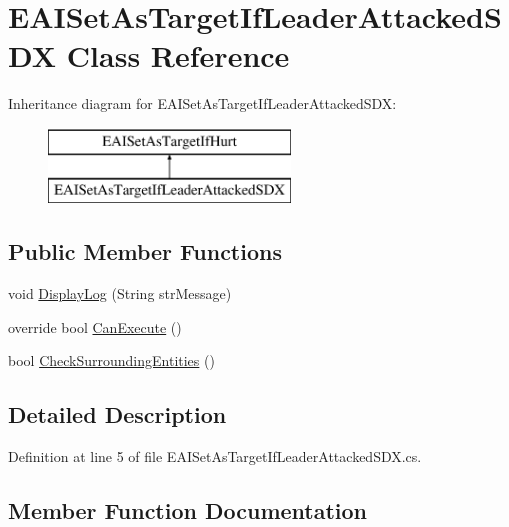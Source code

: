 \hypertarget{class_e_a_i_set_as_target_if_leader_attacked_s_d_x}{}\section{E\+A\+I\+Set\+As\+Target\+If\+Leader\+Attacked\+S\+DX Class Reference}
\label{class_e_a_i_set_as_target_if_leader_attacked_s_d_x}
Inheritance diagram for E\+A\+I\+Set\+As\+Target\+If\+Leader\+Attacked\+S\+DX\+:\begin{figure}[H]
\begin{center}
\leavevmode
\includegraphics[height=2.000000cm]{class_e_a_i_set_as_target_if_leader_attacked_s_d_x}
\end{center}
\end{figure}
\subsection*{Public Member Functions}
\begin{DoxyCompactItemize}
\item 
void \mbox{\hyperlink{class_e_a_i_set_as_target_if_leader_attacked_s_d_x_ac6971e678bcccd43ead16491145e3c4b}{Display\+Log}} (String str\+Message)
\item 
override bool \mbox{\hyperlink{class_e_a_i_set_as_target_if_leader_attacked_s_d_x_a41a5de3f7eaca129bbfadb0e84375494}{Can\+Execute}} ()
\item 
bool \mbox{\hyperlink{class_e_a_i_set_as_target_if_leader_attacked_s_d_x_a69887bc9691491549b640e9aa4bb00bd}{Check\+Surrounding\+Entities}} ()
\end{DoxyCompactItemize}


\subsection{Detailed Description}


Definition at line 5 of file E\+A\+I\+Set\+As\+Target\+If\+Leader\+Attacked\+S\+D\+X.\+cs.



\subsection{Member Function Documentation}
\mbox{\label{class_e_a_i_set_as_target_if_leader_attacked_s_d_x_a41a5de3f7eaca129bbfadb0e84375494}} 
